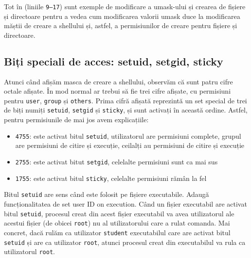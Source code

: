 
Tot în  (liniile \texttt{9--17}) sunt exemple de modificare a umask-ului și crearea de fișiere și
directoare pentru a vedea cum modificarea valorii umask duce la modificarea
măștii de creare a shellului și, astfel, a permisiunilor de creare pentru
fișiere și directoare.

\subsection{Biți speciali de acces: setuid, setgid, sticky}
\label{sec:user:special-bits}

Atunci când afișăm masca de creare a shellului, observăm că sunt patru cifre octale
afișate. În mod normal ar trebui să fie trei cifre afișate, cu permisiuni pentru
\texttt{user}, \texttt{group} și \texttt{others}. Prima cifră afișată reprezintă un set special de trei de
biți numiți \texttt{setuid}, \texttt{setgid} și \texttt{sticky}, și sunt activați în această ordine.
Astfel, pentru permisiunile de mai jos avem explicațiile:

\begin{itemize}
  \item \texttt{4755}: este activat bitul \texttt{setuid}, utilizatorul are permisiuni
		complete, grupul are permisiuni de citire și execuție, ceilalți
		au permisiuni de citire și execuție
              \item \texttt{2755}: este activat bitut \texttt{setgid}, celelalte permisiuni sunt ca mai
		sus
              \item \texttt{1755}: este activat bitul \texttt{sticky}, celelalte permisiuni rămân la fel
\end{itemize}

Bitul \texttt{setuid} are sens când este folosit pe fișiere executabile. Adaugă
funcționalitatea de set user ID on execution. Când un fișier executabil are
activat bitul \texttt{setuid}, procesul creat din acest fișier executabil va avea
utilizatorul ale acestui fișier (de obicei \texttt{root}) nu al utilizatorului care a
rulat comanda. Mai concret, dacă rulăm ca utilizator \texttt{student} executabilul 
care are activat bitul \texttt{setuid} și are ca utilizator \texttt{root}, atunci procesul creat
din executabilul  va rula ca utilizatorul \texttt{root}.


